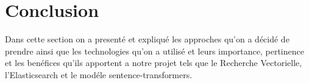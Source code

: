 \section{Conclusion}
\noindent
Dans cette section on a presenté et expliqué les approches qu'on a décidé de prendre ainsi que les technologies qu'on a utilisé et leurs importance, pertinence et les benéfices qu'ils apportent a notre projet tels que le Recherche Vectorielle, l'Elasticsearch et le modéle sentence-transformers.